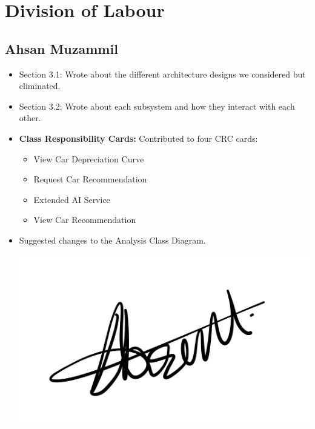 \documentclass[]{article}
\begin{document}
\appendix
\section{Division of Labour}
\label{sec:division_of_labour}
\subsection{Ahsan Muzammil}
\begin{itemize}
    \item Section 3.1: Wrote about the different architecture designs we considered but eliminated.
    \item Section 3.2: Wrote about each subsystem and how they interact with each other.
    \item \textbf{Class Responsibility Cards:} Contributed to four CRC cards:
    \begin{itemize}
        \item View Car Depreciation Curve
        \item Request Car Recommendation
        \item Extended AI Service
        \item View Car Recommendation
    \end{itemize}
    \item Suggested changes to the Analysis Class Diagram.
    \begin{center}
        \includegraphics[scale=0.1]{ahsan.jpeg}
    \end{center}
\end{itemize}
\end{document}
